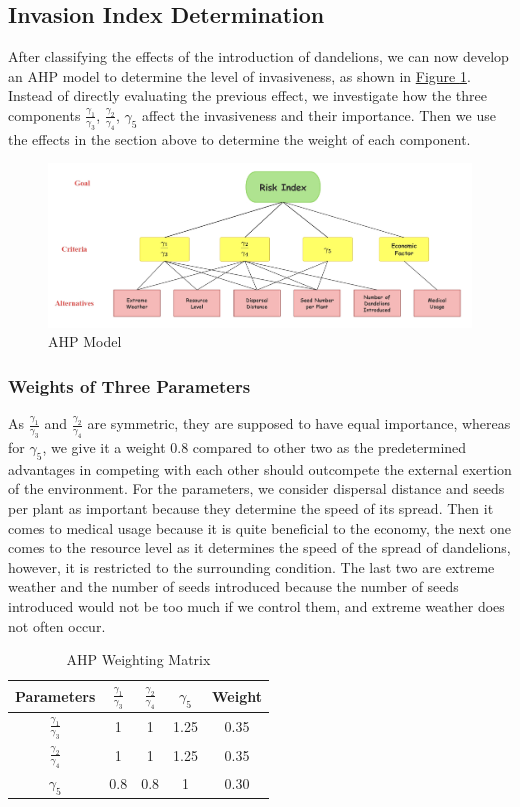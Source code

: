 \documentclass[12pt]{article}
\begin{document}
\subsection{Invasion Index Determination}
After classifying the effects of the introduction of dandelions, we can now develop an AHP model to determine the level of invasiveness, as shown in \hyperref[AHP]{Figure \ref*{AHP}}. Instead of directly evaluating the previous effect, we investigate how the three components $\frac{\gamma_1}{\gamma_3}$, $\frac{\gamma_2}{\gamma_4}$, $\gamma_5$ affect the invasiveness and their importance. Then we use the effects in the section above to determine the weight of each component.
\begin{figure}[h]
    \centering
    \includegraphics[width=\linewidth]{img/AHP.png}
    \caption{AHP Model}
    \label{AHP}
\end{figure}

\subsubsection{Weights of Three Parameters}
As $\frac{\gamma_1}{\gamma_3}$ and $\frac{\gamma_2}{\gamma_4}$ are symmetric, they are supposed to have equal importance, whereas for $\gamma_5$, we give it a weight $0.8$ compared to other two as the predetermined advantages in competing with each other should outcompete the external exertion of the environment. For the parameters, we consider dispersal distance and seeds per plant as important because they determine the speed of its spread. Then it comes to medical usage because it is quite beneficial to the economy, the next one comes to the resource level as it determines the speed of the spread of dandelions, however, it is restricted to the surrounding condition. The last two are extreme weather and the number of seeds introduced because the number of seeds introduced would not be too much if we control them, and extreme weather does not often occur.
\begin{table}[h]
\renewcommand{\arraystretch}{1.5}
\centering
\caption{AHP Weighting Matrix}
\begin{tabular}{|c|c|c|c|c|}
\hline
Parameters & $\frac{\gamma_1}{\gamma_3}$ &  $\frac{\gamma_2}{\gamma_4}$&  $\gamma_5$&  Weight\\ \hline
$\frac{\gamma_1}{\gamma_3}$ &1&1  &  1.25&  0.35\\ \hline
$\frac{\gamma_2}{\gamma_4}$&1    &    1&  1.25&  0.35\\ \hline
$\gamma_5$&0.8&0.8&1&0.30\\ \hline

\end{tabular}
\label{AHP WM}
\end{table}
\end{document}
